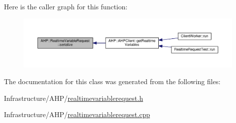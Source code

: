 Here is the caller graph for this function\+:
\nopagebreak
\begin{figure}[H]
\begin{center}
\leavevmode
\includegraphics[width=350pt]{class_a_h_p_1_1_realtime_variable_request_a448db16090f04e1b6635af9a3f9c5291_icgraph}
\end{center}
\end{figure}




The documentation for this class was generated from the following files\+:\begin{DoxyCompactItemize}
\item 
Infrastructure/\+A\+H\+P/\hyperlink{realtimevariablerequest_8h}{realtimevariablerequest.\+h}\item 
Infrastructure/\+A\+H\+P/\hyperlink{realtimevariablerequest_8cpp}{realtimevariablerequest.\+cpp}\end{DoxyCompactItemize}
